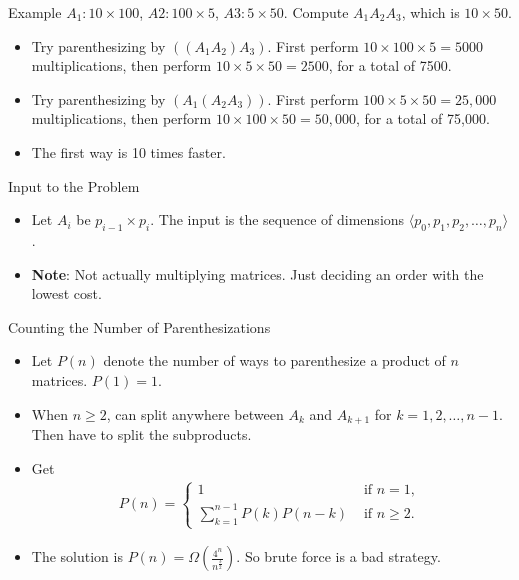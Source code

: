 \documentclass{beamer}
\begin{document}
\begin{frame}{Example}
    $A_1: 10 \times 100$, $A2: 100 \times 5$, $A3: 5 \times 50$. Compute $A_1 A_2 A_3$, which is $10 \times 50$.
    \begin{itemize}
        \item Try parenthesizing by $((A_1 A_2) A_3)$. First perform $10 \times 100 \times 5 = 5000$ multiplications, then perform $10 \times 5 \times 50 = 2500$, for a total of 7500.
        \item Try parenthesizing by $(A_1 (A_2 A_3))$. First perform $100 \times 5 \times 50 = 25,000$ multiplications, then perform $10 \times 100 \times 50 = 50,000$, for a total of 75,000.
        \item The ﬁrst way is 10 times faster.
    \end{itemize}
\end{frame}


\begin{frame}{Input to the Problem}
    \begin{itemize}
        \item Let $A_i$ be $p_{i - 1} \times p_i$. The input is the sequence of dimensions $\langle p_0, p_1, p_2, \ldots , p_n \rangle$.
        \item \textbf{Note}: Not actually multiplying matrices. Just deciding an order with the lowest cost.
    \end{itemize}
\end{frame}

\begin{frame}{Counting the Number of Parenthesizations}
    \begin{itemize}
        \item Let $P(n)$ denote the number of ways to parenthesize a product of $n$ matrices. $P(1) = 1$.
        \item When $n \geq 2$, can split anywhere between $A_k$ and $A_{k + 1}$ for $k = 1, 2, \ldots, n - 1$. Then have to split the subproducts.
        \item Get
            \begin{equation*}
                \begin{align*}
                    P(n) =
                        \begin{cases}
                            1 & \text{ if } n = 1 \text{, } \\
                            \sum_{k = 1}^{n - 1} P(k)P(n - k) & \text{ if } n \geq 2 \text{.}
                        \end{cases}
                \end{align*}
            \end{equation*}
        \item The solution is $P(n) = \Omega \left( \frac{4^n}{n^{\frac{3}{2}}} \right)$. So brute force is a bad strategy.
    \end{itemize}
\end{frame}
\end{document}
